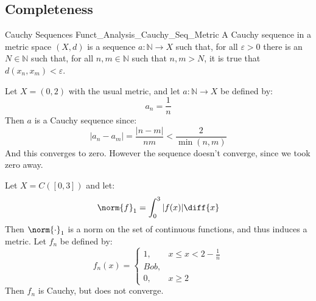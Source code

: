 \documentclass[crop=false,class=book,oneside]{standalone}                      %
\begin{document}
        \subsection{Completeness}
            \begin{ldefinition}{Cauchy Sequences}
                  {Funct_Analysis_Cauchy_Seq_Metric}
                A Cauchy sequence in a metric space $(X,d)$ is a
                sequence $a:\mathbb{N}\rightarrow{X}$ such that,
                for all $\varepsilon>0$ there is an
                $N\in\mathbb{N}$ such that, for all
                $n,m\in\mathbb{N}$ such that $n,m>N$,
                it is true that $d(x_{n},x_{m})<\varepsilon$.
            \end{ldefinition}
            \begin{lexample}
                Let $X=(0,2)$ with the usual metric, and let
                $a:\mathbb{N}\rightarrow{X}$ be defined by:
                \begin{equation}
                    a_{n}=\frac{1}{n}
                \end{equation}
                Then $a$ is a Cauchy sequence since:
                \begin{equation}
                    |a_{n}-a_{m}|=\frac{|n-m|}{nm}
                    <\frac{2}{\min(n,m)}
                \end{equation}
                And this converges to zero. However the sequence
                doesn't converge, since we took zero away.
            \end{lexample}
            \begin{lexample}
                Let $X=C([0,3])$ and let:
                \begin{equation}
                    \norm{f}_{1}=\int_{0}^{3}|f(x)|\diff{x}
                \end{equation}
                Then $\norm{\cdot}_{1}$ is a norm on the set of
                continuous functions, and thus induces a metric.
                Let $f_{n}$ be defined by:
                \begin{equation}
                    f_{n}(x)=
                    \begin{cases}
                        1,&x\leq{x}<2-\frac{1}{n}\\
                        Bob,\\
                        0,&x\geq{2}
                    \end{cases}
                \end{equation}
                Then $f_{n}$ is Cauchy, but does not converge.
            \end{lexample}
\end{document}
